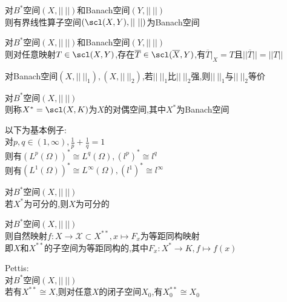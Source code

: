 \begin{dingli}
对$B^*$空间$(X,||\ ||)$和Banach空间$(Y,||\ ||)$\\
则有界线性算子空间$(\scl(X,Y),||\ ||)$为Banach空间
\end{dingli}

\begin{dingli}
对$B^*$空间$(X,||\ ||)$和Banach空间$(Y,||\ ||)$\\
则对任意映射$T\in\scl(X,Y)$,存在$\overline{T}\in \scl(\overline{X},Y)$,有$\overline{T}|_{X}=T$且$||\overline{T}||=||T||$
\end{dingli}

\begin{zhu}
对Banach空间$(X,||\ ||_{1}), (X,||\ ||_{2})$,若$||\ ||_{1}$比$||\ ||_{2}$强,则$||\ ||_{1}$与$||\ ||_{2}$等价
\end{zhu}

\begin{dingyi}
对$B^*$空间$(X,||\ ||)$\\
则称$X^{*}=\scl(X,K)$为$X$的对偶空间,其中$X^{*}$为Banach空间
\end{dingyi}

\begin{zhu}
以下为基本例子:\\
对$p,q\in(1,\infty),\frac{1}{p}+\frac{1}{q}=1$\\
则有$(L^{p}(\Omega))^{*}\cong L^{q}(\Omega), (l^{p})^{*}\cong l^{q}$\\
则有$(L^{1}(\Omega))^{*}\cong L^{\infty}(\Omega), (l^{1})^{*}\cong l^{\infty}$
\end{zhu}

\begin{dingli}
对$B^*$空间$(X,||\ ||)$\\
若$X^{*}$为可分的,则$X$为可分的
\end{dingli}

\begin{dingli}
对$B^*$空间$(X,||\ ||)$\\
则自然映射$f:X\to \mathscr{X}\subset X^{**},x\mapsto F_{x}$为等距同构映射\\
即$X$和$X^{**}$的子空间为等距同构的,其中$F_{x}:X^{*}\to K, f\mapsto f(x)$
\end{dingli}

\begin{dingli}
Pettis:\\
对$B^*$空间$(X,||\ ||)$\\
若有$X^{**}\cong X$,则对任意$X$的闭子空间$X_0$,有$X_0^{**}\cong X_0$
\end{dingli}

